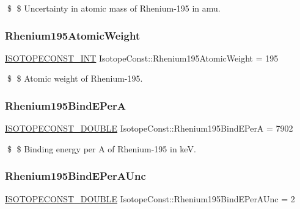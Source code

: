 \$ \$ Uncertainty in atomic mass of Rhenium-\/195 in amu. \mbox{\label{group___isotope_const-_rhenium-_re195_ga4f8180b366e2cd3ce8116fcd08062edb}} 
\subsubsection{\texorpdfstring{Rhenium195\+Atomic\+Weight}{Rhenium195AtomicWeight}}
{\footnotesize\ttfamily \mbox{\hyperlink{group___isotope_const-_macros_ga5f18360b3e99483a35c32d789e62621c}{I\+S\+O\+T\+O\+P\+E\+C\+O\+N\+S\+T\+\_\+\+I\+NT}} Isotope\+Const\+::\+Rhenium195\+Atomic\+Weight = 195}

\$ \$ Atomic weight of Rhenium-\/195. \mbox{\label{group___isotope_const-_rhenium-_re195_gaf7c3cd465651f7f223cb3f5126482921}} 
\subsubsection{\texorpdfstring{Rhenium195\+Bind\+E\+PerA}{Rhenium195BindEPerA}}
{\footnotesize\ttfamily \mbox{\hyperlink{group___isotope_const-_macros_ga8f45a7272ce02c0b4c65c44636ed719a}{I\+S\+O\+T\+O\+P\+E\+C\+O\+N\+S\+T\+\_\+\+D\+O\+U\+B\+LE}} Isotope\+Const\+::\+Rhenium195\+Bind\+E\+PerA = 7902}

\$ \$ Binding energy per A of Rhenium-\/195 in keV. \mbox{\label{group___isotope_const-_rhenium-_re195_ga65f6839cf9646298f876d9aca2ee4aef}} 
\subsubsection{\texorpdfstring{Rhenium195\+Bind\+E\+Per\+A\+Unc}{Rhenium195BindEPerAUnc}}
{\footnotesize\ttfamily \mbox{\hyperlink{group___isotope_const-_macros_ga8f45a7272ce02c0b4c65c44636ed719a}{I\+S\+O\+T\+O\+P\+E\+C\+O\+N\+S\+T\+\_\+\+D\+O\+U\+B\+LE}} Isotope\+Const\+::\+Rhenium195\+Bind\+E\+Per\+A\+Unc = 2}

